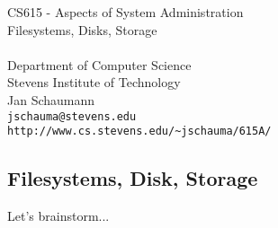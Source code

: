 \documentclass[xga]{xdvislides}
\begin{document}
\setfontphv

\lhead{\slidetitle}				%
\cfoot{\relax}					%
\rfoot{\Gray{\today}}

\vspace*{\fill}
\begin{center}
	\Hugesize
		CS615 - Aspects of System Administration\\ [1em]
		Filesystems, Disks, Storage\\ [1em]
	\hspace*{5mm}\blueline\\ [1em]
	\Normalsize
		Department of Computer Science\\
		Stevens Institute of Technology\\
		Jan Schaumann\\
		\verb+jschauma@stevens.edu+ \\
		\verb+http://www.cs.stevens.edu/~jschauma/615A/+
\end{center}
\vspace*{\fill}

\subsection{Filesystems, Disk, Storage}
Let's brainstorm...

%
%
%
%
\end{document}
